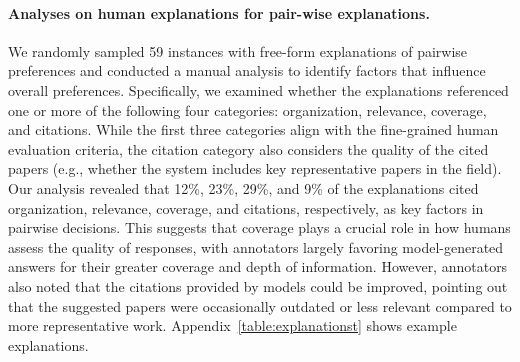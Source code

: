 \paragraph{Analyses on human explanations for pair-wise explanations.}  
We randomly sampled 59 instances with free-form explanations of pairwise preferences and conducted a manual analysis to identify factors that influence overall preferences. Specifically, we examined whether the explanations referenced one or more of the following four categories: organization, relevance, coverage, and citations. While the first three categories align with the fine-grained human evaluation criteria, the citation category also considers the quality of the cited papers (e.g., whether the system includes key representative papers in the field). 
Our analysis revealed that 12\%, 23\%, 29\%, and 9\% of the explanations cited organization, relevance, coverage, and citations, respectively, as key factors in pairwise decisions. This suggests that coverage plays a crucial role in how humans assess the quality of responses, with annotators largely favoring model-generated answers for their greater coverage and depth of information. However, annotators also noted that the citations provided by models could be improved, pointing out that the suggested papers were occasionally outdated or less relevant compared to more representative work. Appendix~\ref{table:explanationst} shows example explanations. 
